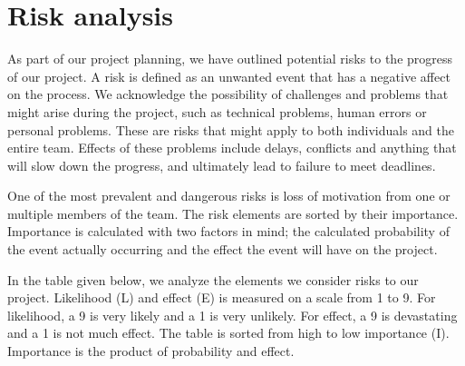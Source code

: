 \section{Risk analysis}
\label{sec:risk}
As part of our project planning, we have outlined potential risks to the progress of our project. A risk is defined as an unwanted event that has a negative affect on the process. We acknowledge the possibility of challenges and problems that might arise during the project, such as technical problems, human errors or personal problems. These are risks that might apply to both individuals and the entire team. Effects of these problems include delays, conflicts and anything that will slow down the progress, and ultimately lead to failure to meet deadlines. 

One of the most prevalent and dangerous risks is loss of motivation from one or multiple members of the team. The risk elements are sorted by their importance. Importance is calculated with two factors in mind; the calculated probability of the event actually occurring and the effect the event will have on the project. 

In the table given below, we analyze the elements we consider risks to our project. Likelihood (L) and effect (E) is measured on a scale from 1 to 9. For likelihood, a 9 is very likely and a 1 is very unlikely. For effect, a 9 is devastating and a 1 is not much effect. The table is sorted from high to low importance (I). Importance is the product of probability and effect. 


